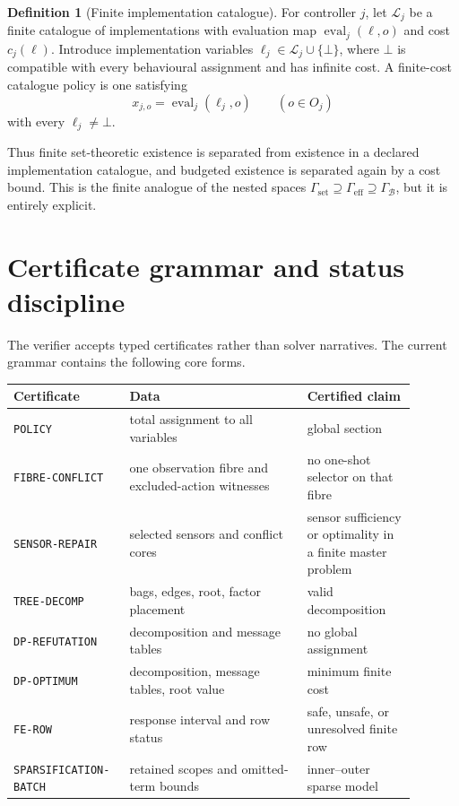 \documentclass[11pt]{article}
\theoremstyle{plain}
\theoremstyle{definition}
\newtheorem{definition}[theorem]{Definition}
\theoremstyle{remark}
\newcommand{\GammaSet}{\Gamma_{\mathrm{set}}}
\newcommand{\GammaEff}{\Gamma_{\mathrm{eff}}}
\newcommand{\GammaB}{\Gamma_{\mathcal B}}
\begin{document}
\begin{definition}[Finite implementation catalogue]
For controller \(j\), let \(\mathcal L_j\) be a finite catalogue of
implementations with evaluation map \(\operatorname{eval}_j(\ell,o)\) and cost
\(c_j(\ell)\).  Introduce implementation variables
\(\ell_j\in\mathcal L_j\cup\{\bot\}\), where \(\bot\) is compatible with every
behavioural assignment and has infinite cost.  A finite-cost catalogue policy is
one satisfying
\[
  x_{j,o}=\operatorname{eval}_j(\ell_j,o)
  \qquad(o\in O_j)
\]
with every \(\ell_j\ne\bot\).
\end{definition}

Thus finite set-theoretic existence is separated from existence in a declared
implementation catalogue, and budgeted existence is separated again by a cost
bound.  This is the finite analogue of the nested spaces
\(\GammaSet\supseteq\GammaEff\supseteq\GammaB\), but it is entirely explicit.

\section{Certificate grammar and status discipline}
\label{sec:certificates}

The verifier accepts typed certificates rather than solver narratives.  The
current grammar contains the following core forms.

\begin{center}
\begin{tabular}{@{}p{0.23\linewidth}p{0.41\linewidth}p{0.25\linewidth}@{}}
\toprule
Certificate & Data & Certified claim\\
\midrule
\texttt{POLICY} & total assignment to all variables & global section\\
\texttt{FIBRE-CONFLICT} & one observation fibre and excluded-action witnesses & no one-shot selector on that fibre\\
\texttt{SENSOR-REPAIR} & selected sensors and conflict cores & sensor sufficiency or optimality in a finite master problem\\
\texttt{TREE-DECOMP} & bags, edges, root, factor placement & valid decomposition\\
\texttt{DP-REFUTATION} & decomposition and message tables & no global assignment\\
\texttt{DP-OPTIMUM} & decomposition, message tables, root value & minimum finite cost\\
\texttt{FE-ROW} & response interval and row status & safe, unsafe, or unresolved finite row\\
\texttt{SPARSIFICATION-BATCH} & retained scopes and omitted-term bounds & inner--outer sparse model\\
\bottomrule
\end{tabular}
\end{center}
\end{document}
